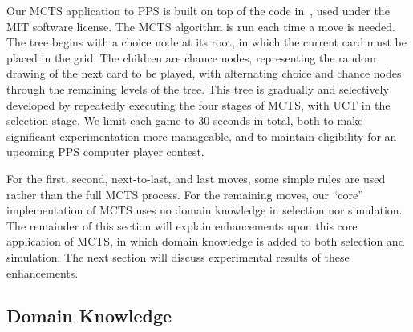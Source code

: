 \documentclass[letterpaper]{article}
\begin{document}

Our MCTS application to PPS is built on top of the code in~\cite{hughart2012uct}, used under the MIT software license. The MCTS algorithm is run each time a move is needed. The tree begins with a choice node at its root, in which the current card must be placed in the grid. The children are chance nodes, representing the random drawing of the next card to be played, with alternating choice and chance nodes through the remaining levels of the tree. This tree is gradually and selectively developed by repeatedly executing the four stages of MCTS, with UCT in the selection stage. We limit each game to 30 seconds in total, both to make significant experimentation more manageable, and to maintain eligibility for an upcoming PPS computer player contest. 

For the first, second, next-to-last, and last moves, some simple rules are used rather than the full MCTS process. For the remaining moves, our ``core'' implementation of MCTS uses no domain knowledge in selection nor simulation. The remainder of this section will explain enhancements upon this core application of MCTS, in which domain knowledge is added to both selection and simulation. The next section will discuss experimental results of these enhancements.

\subsection{Domain Knowledge}
\end{document}
